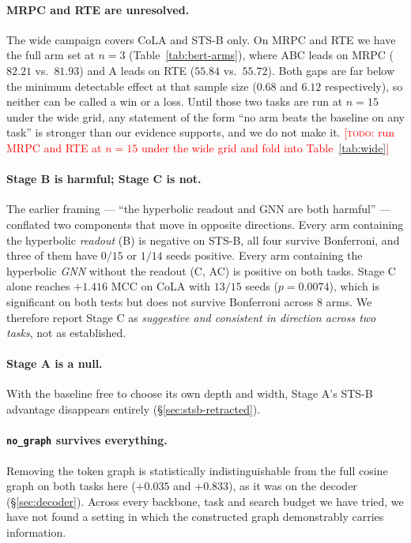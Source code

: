 \documentclass{article} %
\newcommand{\TODO}[1]{\textcolor{red}{[\textsc{todo}: #1]}}
\begin{document}
\paragraph{MRPC and RTE are unresolved.} The wide campaign covers CoLA and
STS-B only. On MRPC and RTE we have the full arm set at $n=3$
(Table~\ref{tab:bert-arms}), where ABC leads on MRPC ($82.21$ vs.\ $81.93$) and
A leads on RTE ($55.84$ vs.\ $55.72$). Both gaps are far below the minimum
detectable effect at that sample size ($0.68$ and $6.12$ respectively), so
neither can be called a win or a loss. Until those two tasks are run at $n=15$
under the wide grid, any statement of the form ``no arm beats the baseline on
any task'' is stronger than our evidence supports, and we do not make it.
\TODO{run MRPC and RTE at $n=15$ under the wide grid and fold into
Table~\ref{tab:wide}}

\paragraph{Stage B is harmful; Stage C is not.} The earlier framing --- ``the
hyperbolic readout and GNN are both harmful'' --- conflated two components that
move in opposite directions. Every arm containing the hyperbolic \emph{readout}
(B) is negative on STS-B, all four survive Bonferroni, and three of them have
$0/15$ or $1/14$ seeds positive. Every arm containing the hyperbolic \emph{GNN}
without the readout (C, AC) is positive on both tasks. Stage C alone reaches
$+1.416$ MCC on CoLA with $13/15$ seeds ($p=0.0074$), which is significant on
both tests but does not survive Bonferroni across 8 arms. We therefore report
Stage C as \emph{suggestive and consistent in direction across two tasks},
not as established.

\paragraph{Stage A is a null.} With the baseline free to choose its own depth
and width, Stage A's STS-B advantage disappears entirely
(\S\ref{sec:stsb-retracted}).

\paragraph{\texttt{no\_graph} survives everything.} Removing the token graph is
statistically indistinguishable from the full cosine graph on both tasks here
($+0.035$ and $+0.833$), as it was on the decoder (\S\ref{sec:decoder}). Across
every backbone, task and search budget we have tried, we have not found a
setting in which the constructed graph demonstrably carries information.
\end{document}
